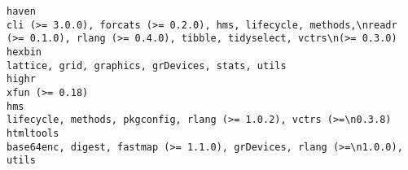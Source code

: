 \documentclass[
  letterpaper,
  DIV=11,
  numbers=noendperiod]{scrreprt}
\begin{document}
\begin{verbatim}
haven                                                                                                                                                                                                                                                                                                                                                                                                                                                                              cli (>= 3.0.0), forcats (>= 0.2.0), hms, lifecycle, methods,\nreadr (>= 0.1.0), rlang (>= 0.4.0), tibble, tidyselect, vctrs\n(>= 0.3.0)
hexbin                                                                                                                                                                                                                                                                                                                                                                                                                                                                                                                                                                    lattice, grid, graphics, grDevices, stats, utils
highr                                                                                                                                                                                                                                                                                                                                                                                                                                                                                                                                                                                                       xfun (>= 0.18)
hms                                                                                                                                                                                                                                                                                                                                                                                                                                                                                                                                                     lifecycle, methods, pkgconfig, rlang (>= 1.0.2), vctrs (>=\n0.3.8)
htmltools                                                                                                                                                                                                                                                                                                                                                                                                                                                                                                                                       base64enc, digest, fastmap (>= 1.1.0), grDevices, rlang (>=\n1.0.0), utils

\end{verbatim}
\end{document}

